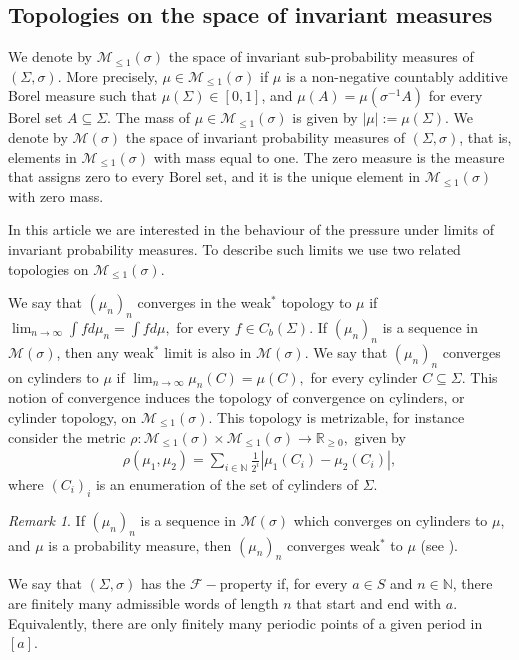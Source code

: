 \documentclass[letterpaper,11pt]{amsart}
\theoremstyle{plain}
\theoremstyle{plain}
\theoremstyle{definition}
\theoremstyle{remark}
\newtheorem{remark}{Remark}[section]
\def\R{{\mathbb R}}
\def\N{{\mathbb N}}
\def\M{{\mathcal M}}
\def\F{{\mathcal F}}
\begin{document}
\subsection{Topologies on the space of invariant measures}\label{introtop} We denote by $\M_{\le1}(\sigma)$ the space of invariant sub-probability measures of $(\Sigma, \sigma)$. More precisely, $\mu \in \M_{\le1}(\sigma)$ if $\mu$ is a non-negative countably additive Borel measure such that $\mu(\Sigma) \in [0,1]$, and $\mu(A) = \mu(\sigma^{-1}A)$ for every Borel set $A \subseteq \Sigma$. The mass of $\mu \in \M_{\le1}(\sigma)$ is given by $|\mu| := \mu(\Sigma)$. We denote by $\M(\sigma)$ the space of invariant probability measures of $(\Sigma,\sigma)$, that is, elements in $\M_{\le1}(\sigma)$ with mass equal to one. The zero measure is the measure that assigns zero to every Borel set, and it is the unique element in $\M_{\le1}(\sigma)$ with zero mass.

 In this article we are  interested in the behaviour of the pressure under limits of invariant probability measures. To describe such limits we use two related topologies on $\M_{\le 1}(\sigma)$. 

We say that $(\mu_n)_n$ converges in the weak$^*$ topology to $\mu$ if  $\lim_{n\to\infty} \int fd\mu_n=\int fd\mu,$ for every $f\in C_b(\Sigma)$. If $(\mu_n)_n$ is a sequence in $\M(\sigma)$, then any weak$^*$ limit is also in $\M(\sigma)$. We say that $(\mu_n)_n $ converges on cylinders to $\mu$ if $\lim_{n\to\infty}\mu_n(C)=\mu(C),$ for every cylinder $C\subseteq \Sigma$. This notion of convergence induces the topology of convergence on cylinders, or cylinder topology, on $\M_{\le1}(\sigma)$. This topology is metrizable, for instance consider the metric $\rho:\M_{\le1}(\sigma)\times \M_{\le1}(\sigma)\to\R_{\ge 0},$ given by
\begin{align}\label{metricc} \rho(\mu_1,\mu_2)=\sum_{i\in \N}\frac{1}{2^i}|\mu_1(C_i)-\mu_2(C_i)|,\end{align}
where $(C_i)_i$ is an enumeration of the set of cylinders of $\Sigma$. 

\begin{remark}\label{rem:compatibility}
If $(\mu_n)_n$ is a sequence in $\M(\sigma)$ which converges on cylinders to $\mu$, and $\mu$ is a probability measure, then $(\mu_n)_n$ converges weak$^*$ to $\mu$ (see \cite[Lemma 3.7]{iv}). 
\end{remark}

We say that $(\Sigma,\sigma)$ has the $\F-$property if, for every $a\in S$ and $n\in \N$, there are finitely many admissible words of length $n$ that start and end with $a$. Equivalently, there are only finitely many periodic points of a given period in $[a]$. 
\end{document}
